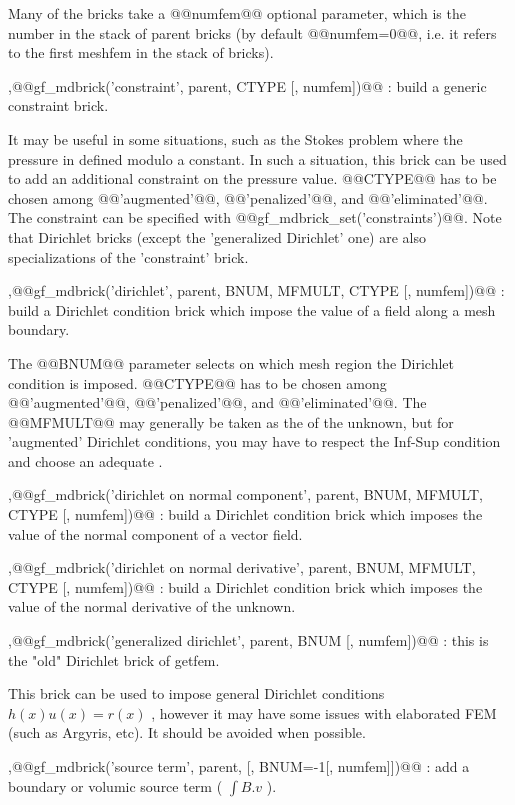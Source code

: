 \begin{cmddescription}
  Many of the bricks take a @@numfem@@ optional parameter, which
  is the \mf number in the stack of parent bricks (by default
  @@numfem=0@@, i.e. it refers to the first meshfem in the stack of
  bricks).

\sep{@@gf_mdbrick('constraint', parent, CTYPE [, numfem])@@}
 : build a generic constraint brick. 

It may be useful in some situations, such as the Stokes problem
where the pressure in defined modulo a constant. In such a
situation, this brick can be used to add an additional
constraint on the pressure value.      
@@CTYPE@@ has to be chosen among @@'augmented'@@, @@'penalized'@@, and
@@'eliminated'@@.  The constraint can be specified with
@@gf_mdbrick_set('constraints')@@. Note that Dirichlet bricks (except the
'generalized Dirichlet' one) are also specializations of the
'constraint' brick.

\sep{@@gf_mdbrick('dirichlet', \tmdbrick parent, \tint BNUM, \tmf MFMULT, \tstr CTYPE [, \tint numfem])@@}
: build a Dirichlet condition brick which impose the value of a field along a mesh boundary.
      
The @@BNUM@@ parameter selects on which mesh region the Dirichlet
condition is imposed. @@CTYPE@@ has to be chosen among @@'augmented'@@, @@'penalized'@@, and @@'eliminated'@@. The @@MFMULT@@ may generally be taken
as the \mf of the unknown, but for 'augmented' Dirichlet
conditions, you may have to respect the Inf-Sup condition and
choose an adequate \mf.

\sep{@@gf_mdbrick('dirichlet on normal component', parent, BNUM, MFMULT, CTYPE [, numfem])@@}
 : build a Dirichlet condition brick which imposes the value of the normal component of a vector field.

\sep{@@gf_mdbrick('dirichlet on normal derivative', parent, BNUM, MFMULT, CTYPE [, numfem])@@}
 : build a Dirichlet condition brick which imposes the value of the normal derivative of the unknown.

\sep{@@gf_mdbrick('generalized dirichlet', parent, BNUM [, numfem])@@} : this is the "old" Dirichlet brick of getfem. 
      
This brick can be used to impose general Dirichlet conditions
$h(x)u(x) = r(x)$ , however it may have some issues with elaborated FEM (such as Argyris, etc). It should be avoided when possible.


\sep{@@gf_mdbrick('source term', parent, [, BNUM=-1[, numfem]])@@}
 : add a boundary or volumic source term ( $\int B.v$ ).


\end{cmddescription}
